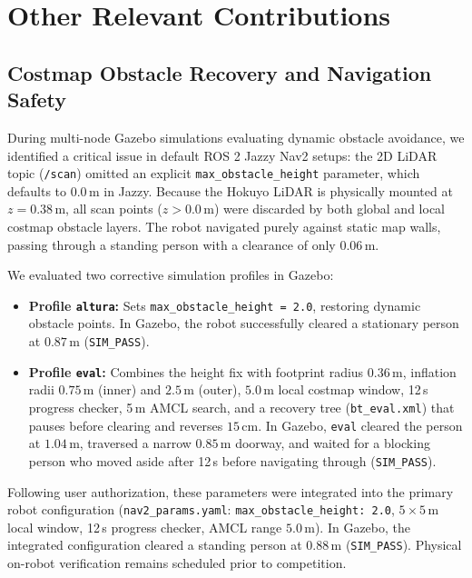 \documentclass[runningheads,a4paper]{llncs}
\begin{document}
\section{Other Relevant Contributions}
\label{sec:other_contributions}

\subsection{Costmap Obstacle Recovery and Navigation Safety}
During multi-node Gazebo simulations evaluating dynamic obstacle avoidance, we identified a critical issue in default ROS 2 Jazzy Nav2 setups: the 2D LiDAR topic (\texttt{/scan}) omitted an explicit \texttt{max\_obstacle\_height} parameter, which defaults to $0.0\,\text{m}$ in Jazzy. Because the Hokuyo LiDAR is physically mounted at $z = 0.38\,\text{m}$, all scan points ($z > 0.0\,\text{m}$) were discarded by both global and local costmap obstacle layers. The robot navigated purely against static map walls, passing through a standing person with a clearance of only $0.06\,\text{m}$.

We evaluated two corrective simulation profiles in Gazebo:
\begin{itemize}
    \item \textbf{Profile \texttt{altura}:} Sets \texttt{max\_obstacle\_height = 2.0}, restoring dynamic obstacle points. In Gazebo, the robot successfully cleared a stationary person at $0.87\,\text{m}$ (\texttt{SIM\_PASS}).
    \item \textbf{Profile \texttt{eval}:} Combines the height fix with footprint radius $0.36\,\text{m}$, inflation radii $0.75\,\text{m}$ (inner) and $2.5\,\text{m}$ (outer), $5.0\,\text{m}$ local costmap window, 12\,s progress checker, 5\,m AMCL search, and a recovery tree (\texttt{bt\_eval.xml}) that pauses before clearing and reverses $15\,\text{cm}$. In Gazebo, \texttt{eval} cleared the person at $1.04\,\text{m}$, traversed a narrow $0.85\,\text{m}$ doorway, and waited for a blocking person who moved aside after 12\,s before navigating through (\texttt{SIM\_PASS}).
\end{itemize}
Following user authorization, these parameters were integrated into the primary robot configuration (\texttt{nav2_params.yaml}: \texttt{max\_obstacle_height: 2.0}, $5\times 5\,\text{m}$ local window, 12\,s progress checker, AMCL range $5.0\,\text{m}$). In Gazebo, the integrated configuration cleared a standing person at $0.88\,\text{m}$ (\texttt{SIM\_PASS}). Physical on-robot verification remains scheduled prior to competition.
\end{document}
